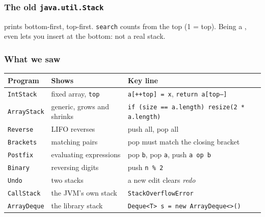 \documentclass[aspectratio=169,10pt,compress]{beamer}
\begin{document}
\begin{frame}[t,fragile] \frametitle{The old \texttt{java.util.Stack}}

  \vspace{0.2em}
  \small {} prints bottom-first,  top-first. \texttt{search} counts from the top (1 = top). Being a ,  even lets you insert at the bottom: not a real stack.
\end{frame}





\begin{frame}[t,fragile] \frametitle{What we saw}
  \begin{center}\small
  \begin{tabular}{lL{0.28\textwidth}L{0.36\textwidth}}
    \toprule
    \textbf{Program}       & \textbf{Shows}                       & \textbf{Key line} \\
    \midrule
    \texttt{IntStack}      & fixed array, \texttt{top}            & \texttt{a[++top] = x}, \texttt{return a[top--]} \\
    \texttt{ArrayStack}    & generic, grows and shrinks           & \texttt{if (size == a.length) resize(2 * a.length)} \\
    \texttt{Reverse}       & LIFO reverses                        & push all, pop all \\
    \texttt{Brackets}      & matching pairs                       & pop must match the closing bracket \\
    \texttt{Postfix}       & evaluating expressions               & pop \texttt{b}, pop \texttt{a}, push \texttt{a op b} \\
    \texttt{Binary}        & reversing digits                     & push \texttt{n \% 2} \\
    \texttt{Undo}          & two stacks                           & a new edit clears \emph{redo} \\
    \texttt{CallStack}     & the JVM's own stack                  & \texttt{StackOverflowError} \\
    \texttt{ArrayDeque}    & the library stack                    & \texttt{Deque<T> s = new ArrayDeque<>()} \\
    \bottomrule
  \end{tabular}
  \end{center}
\end{frame}
\end{document}
